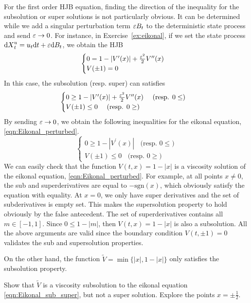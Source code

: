 \documentclass[11pt]{book}
\newcommand{\dd}{\text{\normalfont d}}
\newcommand{\dt}{\text{\normalfont d}t}
\newcommand{\dX}{\text{\normalfont d}X}
\begin{document}
For the first order HJB equation, finding the direction of the inequality for the subsolution or super solutions is not particularly obvious. It can be determined while we add a singular perturbation term $\varepsilon B_t$ to the deterministic state process and send $\varepsilon\to0$. For instance, in Exercise~\ref{ex:eikonal}, if we set the state process ${\dX}_t^u=u_t{{\dt}}+\eps {\dd}B_t$, we obtain the HJB 
\begin{equation}\label{eqn:Eikonal_perturbed}
\begin{cases}
		0=1-|V^{\prime}(x)|+\frac{\varepsilon^2}{2}V^{\prime\prime}(x)\\
		V(\pm1)=0
\end{cases}
\end{equation}
In this case, the subsolution (resp. super) can satisfies
\begin{equation}
\begin{cases}
		0\ge1-|V^{\prime}(x)|+\frac{\varepsilon^2}{2}V^{\prime\prime}(x)~~~~\textrm{(resp. $0\le$)}\\
		V(\pm1)\le0~~~~\textrm{(resp. $0\ge$)}
\end{cases}
\end{equation}
By sending $\varepsilon\to0$, we obtain the following inequalities for the eikonal equation, \eqref{eqn:Eikonal_perturbed}.
\begin{equation}\label{eqn:Eikonal_sub_super}
\begin{cases}
		0\ge1-|V^{\prime}(x)|~~~~\textrm{(resp. $0\le$)}\\
		V(\pm1)\le0~~~~\textrm{(resp. $0\ge$)}
\end{cases}
\end{equation}
We can easily check that the function $V(t,x)=1-|x|$ is a viscosity solution of the eikonal equation, \eqref{eqn:Eikonal_perturbed}. For example, at all points $x\neq0$, the sub and superderivatives are equal to $-\textrm{sgn}(x)$, which obviously satisfy the equation with equality. At $x=0$, we only have super derivatives and the set of subderivatives is empty set. This makes the supersolution property to hold obviously by the false antecedent. The set of superderivatives contains all $m\in[-1,1]$. Since $0\le1-|m|$, then $V(t,x)=1-|x|$ is also a subsolution. All the above arguments are valid since the boundary condition $V(t,\pm1)=0$ validates the sub and supersolution properties. 

On the other hand, the function $\tilde{V}=\min\{|x|,1-|x|\}$ only satisfies the subsolution property. 
\begin{ex}
Show that $\tilde{V}$ is a viscosity subsolution to the eikonal equation \eqref{eqn:Eikonal_sub_super}, but not a super solution. Explore the points $x=\pm\frac12$.
\end{ex}
\end{document}
